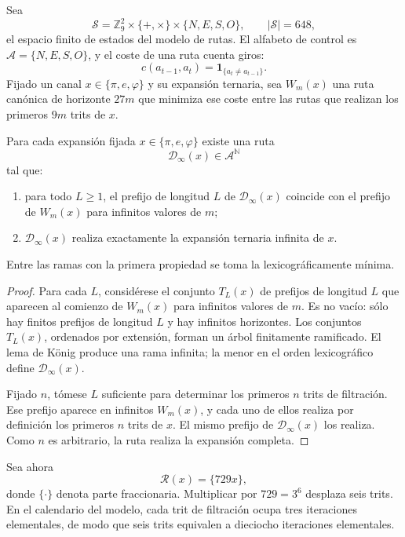Sea
\[
\mathcal S
=\mathbb Z_9^2
\times\{+,\times\}
\times\{N,E,S,O\},
\qquad
|\mathcal S|=648,
\]
el espacio finito de estados del modelo de rutas. El alfabeto de control es
\(\mathcal A=\{N,E,S,O\}\), y el coste de una ruta cuenta giros:
\[
c(a_{t-1},a_t)=\mathbf1_{\{a_t\neq a_{t-1}\}}.
\]
Fijado un canal \(x\in\{\pi,e,\varphi\}\) y su expansión ternaria, sea
\(W_m(x)\) una ruta canónica de horizonte \(27m\) que minimiza ese coste
entre las rutas que realizan los primeros \(9m\) trits de \(x\).

\begin{theorem}
\label{thm:rayo-coinductivo-condicionado-rev6}
Para cada expansión fijada \(x\in\{\pi,e,\varphi\}\) existe una ruta
\[
\mathcal D_\infty(x)\in\mathcal A^{\mathbb N}
\]
tal que:
\begin{enumerate}
\item para todo \(L\geq1\), el prefijo de longitud \(L\) de
\(\mathcal D_\infty(x)\) coincide con el prefijo de \(W_m(x)\) para
infinitos valores de \(m\);
\item \(\mathcal D_\infty(x)\) realiza exactamente la expansión ternaria
infinita de \(x\).
\end{enumerate}
Entre las ramas con la primera propiedad se toma la lexicográficamente
mínima.
\end{theorem}

\begin{proof}
Para cada \(L\), considérese el conjunto \(T_L(x)\) de prefijos de longitud
\(L\) que aparecen al comienzo de \(W_m(x)\) para infinitos valores de
\(m\). Es no vacío: sólo hay finitos prefijos de longitud \(L\) y hay
infinitos horizontes. Los conjuntos \(T_L(x)\), ordenados por extensión,
forman un árbol finitamente ramificado. El lema de König produce una rama
infinita; la menor en el orden lexicográfico define
\(\mathcal D_\infty(x)\).

Fijado \(n\), tómese \(L\) suficiente para determinar los primeros \(n\)
trits de filtración. Ese prefijo aparece en infinitos \(W_m(x)\), y cada uno de
ellos realiza por definición los primeros \(n\) trits de \(x\). El mismo
prefijo de \(\mathcal D_\infty(x)\) los realiza. Como \(n\) es arbitrario,
la ruta realiza la expansión completa.
\end{proof}

Sea ahora
\[
\mathcal R(x)=\{729x\},
\]
donde \(\{\cdot\}\) denota parte fraccionaria. Multiplicar por
\(729=3^6\) desplaza seis trits. En el calendario del modelo, cada trit de
filtración ocupa tres iteraciones elementales, de modo que seis trits
equivalen a dieciocho iteraciones elementales.


